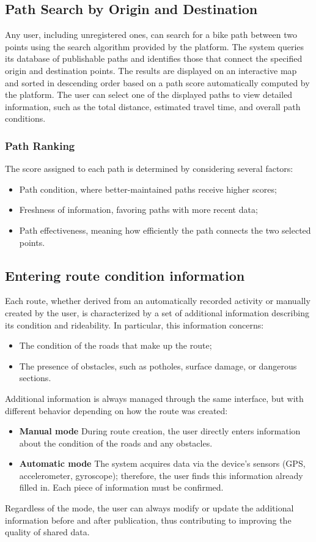 \subsection*{Path Search by Origin and Destination}
Any user, including unregistered ones, can search for a bike path between two points using the search algorithm provided by the platform.
The system queries its database of publishable paths and identifies those that connect the specified origin and destination points.
The results are displayed on an interactive map and sorted in descending order based on a path score automatically computed by the platform.
The user can select one of the displayed paths to view detailed information, such as the total distance, estimated travel time, and overall path conditions.
\subsubsection*{Path Ranking}
The score assigned to each path is determined by considering several factors:
\begin{itemize}
    \item Path condition, where better-maintained paths receive higher scores;
    \item Freshness of information, favoring paths with more recent data;
    \item Path effectiveness, meaning how efficiently the path connects the two selected points.
\end{itemize}

\subsection*{Entering route condition information}
Each route, whether derived from an automatically recorded activity or manually created by the user, is characterized by a set of additional information describing its condition and rideability.
In particular, this information concerns:
\begin{itemize}
    \item{The condition of the roads that make up the route;}
    \item{The presence of obstacles, such as potholes, surface damage, or dangerous sections.}
\end{itemize}
Additional information is always managed through the same interface, but with different behavior depending on how the route was created:
\begin{itemize}
    \item{\textbf{Manual mode} During route creation, the user directly enters information about the condition of the roads and any obstacles.}
    \item{\textbf{Automatic mode} The system acquires data via the device’s sensors (GPS, accelerometer, gyroscope); therefore, the user finds this information already filled in. Each piece of information must be confirmed.}
\end{itemize}
Regardless of the mode, the user can always modify or update the additional information before and after publication, thus contributing to improving the quality of shared data.

